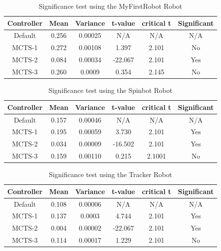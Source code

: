 \begin{table}
\begin{center}
\renewcommand{\arraystretch}{1}
\caption{Significance test using the MyFirstRobot Robot}
\label{table-MFS-significance}
\begin{tabular}{|c | c | c |c | c | c |}
\hline
Controller & Mean & Variance & t-value & critical t & Significant\\
\hline
Default & 0.256 & 0.00025 & N/A & N/A & N/A\\
\hline
MCTS-1 & 0.272 & 0.00108 & 1.397 & 2.101 & No\\
\hline
MCTS-2 & 0.084 & 0.00034 & -22.067 & 2.101 & Yes\\
\hline
MCTS-3 & 0.260 & 0.0009 & 0.354 & 2.145 & No\\
\hline
\end{tabular}
\end{center}
\end{table}

\begin{table}
\begin{center}
\renewcommand{\arraystretch}{1}
\caption{Significance test using the Spinbot Robot}
\label{table-spinbot-significance}
\begin{tabular}{|c | c | c |c | c | c |}
\hline
Controller & Mean & Variance & t-value & critical t & Significant\\
\hline
Default & 0.157 & 0.00046 & N/A & N/A & N/A\\
\hline
MCTS-1 & 0.195 & 0.00059 & 3.730 & 2.101 & Yes\\
\hline
MCTS-2 & 0.034 & 0.00009 & -16.502 & 2.101 & Yes\\
\hline
MCTS-3 & 0.159 & 0.00110 & 0.215 & 2.1001& No\\
\hline
\end{tabular}
\end{center}
\end{table}

\begin{table}
\begin{center}
\renewcommand{\arraystretch}{1}
\caption{Significance test using the Tracker Robot}
\label{table-tracker-significance}
\begin{tabular}{|c | c | c |c | c | c |}
\hline
Controller & Mean & Variance & t-value & critical t & Significant\\
\hline
Default & 0.108 & 0.00006 & N/A & N/A & N/A\\
\hline
MCTS-1 & 0.137 & 0.0003 & 4.744 & 2.101 & Yes\\
\hline
MCTS-2 & 0.004 & 0.00002 & -22.067 & 2.101 & Yes\\
\hline
MCTS-3 & 0.114 & 0.00017 & 1.229 & 2.101 & No\\
\hline
\end{tabular}
\end{center}
\end{table}

